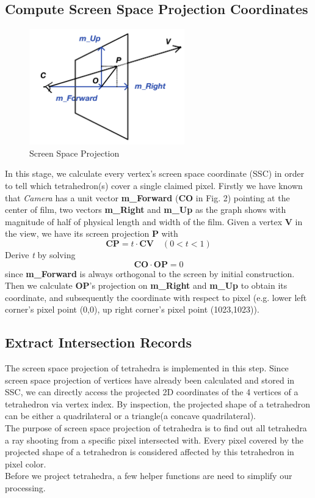 \documentclass[acmtog]{acmart}
\begin{document}
\subsection{Compute Screen Space Projection Coordinates}
\begin{figure}[h]
\centering
\includegraphics[height=5cm]{figure/NbSSC}
\caption{Screen Space Projection}
\end{figure}
In this stage, we calculate every vertex’s screen space coordinate (SSC) in order to tell which tetrahedron(s) cover a single claimed pixel. Firstly we have known that \emph {Camera} has a unit vector 
\textbf{m\_Forward} 
(\textbf{CO} in Fig. 2) pointing at the center of film, two vectors \textbf{m\_Right} and \textbf{m\_Up} as the graph shows with magnitude of half of physical length and width of the film. Given a vertex \textbf{V} in the view, we have its screen projection \textbf{P} with 
\begin{equation} 
\boldsymbol {CP} = t \cdot
\boldsymbol{CV}
\quad (0<t<1)
\end{equation} 
Derive \emph{t} by solving 
\begin{equation} 
\boldsymbol {CO}\cdot \boldsymbol{OP}=0
\end{equation} since \textbf{m\_Forward} is always orthogonal to the screen by initial construction. Then we calculate \textbf{OP}’s projection on \textbf{m\_Right} and \textbf{m\_Up} to obtain its coordinate, and subsequently the coordinate with respect to pixel (e.g. lower left corner’s pixel point (0,0), up right corner’s pixel point (1023,1023)). 

\subsection{Extract Intersection Records}
The screen space projection of tetrahedra is implemented in this step. Since screen space projection of vertices have already been calculated and stored in SSC, we can directly access the projected 2D coordinates of the 4 vertices of a tetrahedron via vertex index. By inspection, the projected shape of a tetrahedron can be either a quadrilateral or a triangle(a concave quadrilateral).
\\The purpose of screen space projection of tetrahedra is to find out all tetrahedra a ray shooting from a specific pixel intersected with. Every pixel covered by the projected shape of a tetrahedron is considered affected by this tetrahedron in pixel color.
\\
Before we project tetrahedra, a few helper functions are need to simplify our processing.
\end{document}
